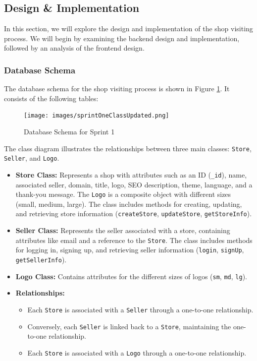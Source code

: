\subsection{Design \& Implementation}
In this section, we will explore the design and implementation of the shop visiting process. We will begin by examining the backend design and implementation, followed by an analysis of the frontend design.

\subsubsection{Database Schema}
The database schema for the shop visiting process is shown in Figure \ref{fig:db_schema_sprint1}. It consists of the following tables:

\begin{figure}[H]
    \centering
    \texttt{[image: images/sprintOneClassUpdated.png]}
    \caption{Database Schema for Sprint 1}
    \label{fig:db_schema_sprint1}
\end{figure}

The class diagram illustrates the relationships between three main classes: \texttt{Store}, \texttt{Seller}, and \texttt{Logo}.

\begin{itemize}
    \item \textbf{Store Class:} Represents a shop with attributes such as an ID (\texttt{\_id}), name, associated seller, domain, title, logo, SEO description, theme, language, and a thank-you message. The \texttt{Logo} is a composite object with different sizes (small, medium, large). The class includes methods for creating, updating, and retrieving store information (\texttt{createStore}, \texttt{updateStore}, \texttt{getStoreInfo}).
    
    \item \textbf{Seller Class:} Represents the seller associated with a store, containing attributes like email and a reference to the \texttt{Store}. The class includes methods for logging in, signing up, and retrieving seller information (\texttt{login}, \texttt{signUp}, \texttt{getSellerInfo}).
    
    \item \textbf{Logo Class:} Contains attributes for the different sizes of logos (\texttt{sm}, \texttt{md}, \texttt{lg}).
    
    \item \textbf{Relationships:}
    \begin{itemize}
        \item Each \texttt{Store} is associated with a \texttt{Seller} through a one-to-one relationship.
        \item Conversely, each \texttt{Seller} is linked back to a \texttt{Store}, maintaining the one-to-one relationship.
        \item Each \texttt{Store} is associated with a \texttt{Logo} through a one-to-one relationship.
    \end{itemize}
\end{itemize}

